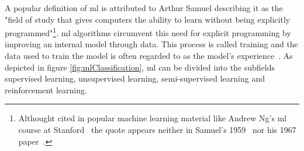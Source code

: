 \documentclass[
			   fontsize=11pt,
               paper=a4,
               bibliography=totoc,
               idxtotoc,
               headsepline,
               footsepline,
               footinclude=false,
               BCOR=12mm,
               DIV=13,
               openany,   %
               ]
               {scrbook}
\begin{document}
A popular definition of \gls{ml} is attributed to Arthur Samuel describing it as the "field of study that gives computers the ability to learn without being explicitly programmed"\footnote{Althought cited in popular machine learning material like Andrew Ng's \gls{ml} course at Stanford~\cite{mlCourseStan} the quote appears neither in Samuel's 1959~\cite{mlQuote1959} nor his 1967 paper~\cite{mlQuote1967}.}. \acrlong{ml} algorithms circumvent this need for explicit programming by improving an internal model through data. This process is called training and the data used to train the model is often regarded to as the model's experience~\cite{mlMitchell}. As depicted in figure \autoref{fig:mlClassification}, \gls{ml} can be divided into the subfields supervised learning, unsupervised learning, semi-supervised learning and reinforcement learning.
\end{document}
